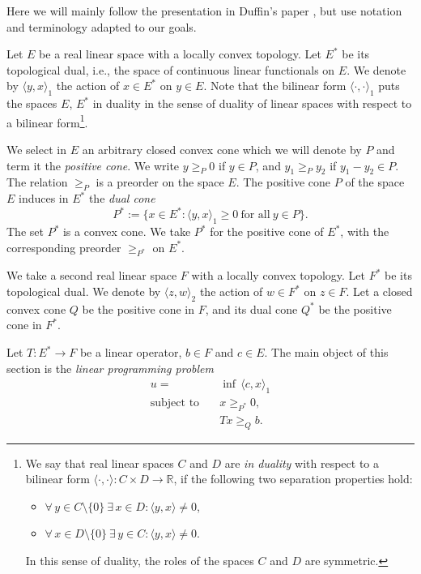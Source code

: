 \documentclass[[a4paper,english,12pt]{amsart}
\theoremstyle{plain}
\theoremstyle{remark}
\newcommand{\RR}{\mathbb R}
\begin{document}
Here we will mainly follow the presentation in Duffin's paper \cite{Duffin}, but use notation and terminology adapted to our goals.

Let $E$ be a real linear space with a locally convex topology. Let $E^*$ be its topological dual, i.e., the space of continuous linear functionals on $E$. We denote by $\langle y, x \rangle_1$ the action of $x \in E^*$ on $y \in E$. Note that the bilinear form $\langle \cdot, \cdot \rangle_1$ puts the spaces $E$, $E^*$ in duality in the sense of duality of linear spaces with respect to a bilinear form\footnote{We say that real linear spaces $C$ and $D$ are \emph{in duality} with respect to a bilinear form $\langle \cdot, \cdot \rangle : C \times D \to \RR$, if the following two separation properties hold:

\begin{itemize}

\item[1)] $\forall \, y \in C \setminus \{ 0 \} \ \exists \, x \in D : \langle y, x \rangle \ne 0$,

\item[2)] $\forall \, x \in D \setminus \{ 0 \} \ \exists \, y \in C : \langle y, x \rangle \ne 0$.

\end{itemize}

In this sense of duality, the roles of the spaces $C$ and  $D$ are symmetric.
}. 


We select in $E$ an arbitrary closed convex cone which we will denote by $P$ and term it the \emph{positive cone}. We write $y \ge_{P} 0$ if $y \in P$, and $y_1 \ge_{P} y_2$ if $y_1 - y_2 \in P$. The relation $\ge_{P}$ is a preorder on the space $E$. The positive cone $P$ of the space $E$ induces in $E^*$ the \emph{dual cone}
$$
P^* := \{ x \in E^* : \langle y, x \rangle_1 \ge 0 \ \text{for all} \ y \in P \}.
$$
The set $P^*$ is a convex cone. We take $P^*$ for the positive cone of $E^*$, with the corresponding preorder $\ge_{P^*}$ on $E^*$. 

We take a second real linear space $F$ with a locally convex topology. Let $F^*$ be its topological dual. We denote by $\langle z, w \rangle_2$ the action of $w \in F^*$ on $z \in F$. Let a closed convex cone $Q$ be the positive cone in $F$, and its dual cone $Q^*$ be the positive cone in $F^*$.  

Let $T : E^* \to F$ be a linear operator, $b \in F$ and $c \in E$. The main object of this section is the \emph{linear programming problem}
\begin{align} \label{eq:LP-prim-problem}
    u = & \inf \, \langle c,x \rangle_1 \\
    \text{subject to} \quad & x \ge_{P^*} 0,  \nonumber \\
    & Tx  \ge_{Q} b. \nonumber
\end{align}
\end{document}
